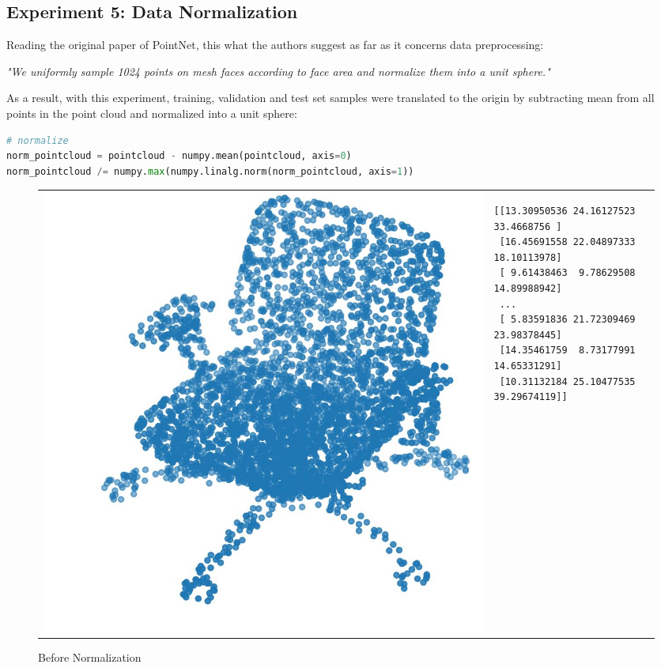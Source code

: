 \documentclass[11pt,a4paper]{article}
\begin{document}
\subsection{Experiment 5: Data Normalization}
Reading the original paper of PointNet, this what the authors suggest as far as it concerns data preprocessing:
\begin{displayquote}
\textit{"We uniformly sample 1024 points on mesh faces according to face area and normalize them into a unit sphere."}
\end{displayquote}
As a result, with this experiment, training, validation and test set samples were translated to the origin by subtracting mean from all points in the point cloud and normalized into a unit sphere:
\begin{lstlisting}[language=Python,frame=single]
# normalize
norm_pointcloud = pointcloud - numpy.mean(pointcloud, axis=0) 
norm_pointcloud /= numpy.max(numpy.linalg.norm(norm_pointcloud, axis=1))
\end{lstlisting}
\begin{figure}[H]
\begin{tabular}{p{}p{}}
\rowcolor{white}
    \begin{minipage}{.4\textwidth}
        \centering
        \includegraphics[scale=0.3]{imgs/example-mesh-normalization-before.jpg}
        \caption{Before Normalization}
    \end{minipage}
    &
    \begin{minipage}{.6\textwidth}
        \begin{lstlisting}
[[13.30950536 24.16127523 33.4668756 ]
 [16.45691558 22.04897333 18.10113978]
 [ 9.61438463  9.78629508 14.89988942]
 ...
 [ 5.83591836 21.72309469 23.98378445]
 [14.35461759  8.73177991 14.65331291]
 [10.31132184 25.10477535 39.29674119]]
        \end{lstlisting}
    \end{minipage}
\end{tabular}
\end{figure}
\end{document}
